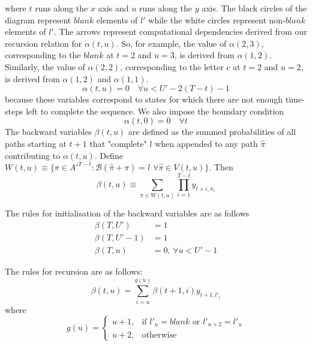 where $t$ runs along the $x$ axis and $u$ runs along the $y$ axis. The black circles of the diagram represent $blank$ elements of $l'$ while the white circles represent non-$blank$ elements of $l'$. The arrows represent computational dependencies derived from our recursion relation for $\alpha(t,u)$. So, for example, the value of $\alpha(2,3)$, corresponding to the $blank$ at $t=2$ and $u=3$, is derived from $\alpha(1,2)$. Similarly, the value of $\alpha(2,2)$, corresponding to the letter $c$ at $t=2$ and $u=2$, is derived from $\alpha(1,2)$ and $\alpha(1,1)$.
\begin{equation}
\alpha(t,u)=0 \quad \forall u < U'-2(T-t)-1
\label{eqn_c3_ctc07}\end{equation}
because these variables correspond to states for which there are not enough time-steps left to complete the sequence. We also impose the boundary condition
\begin{equation}
\alpha(t, 0) = 0 \quad \forall t
\label{eqn_c3_ctc08}
\end{equation}
The backward variables $\beta(t,u)$ are defined as the summed probabilities of all paths starting at $t + 1$ that "complete" $l$ when appended to any path $\hat{\pi}$ contributing to $\alpha(t,u)$. Define $W(t,u) \equiv \{ \pi \in A'^{T-t} : \mathcal{B}(\hat{\pi} + \pi) = l \, \, \forall \hat{\pi} \in V(t,u) \}$. Then
\begin{equation}
\beta(t,u) \equiv \sum_{\pi \in W(t,u)} \prod_{i=1}^{T - t} y_{t + i,\pi_i} \label{eqn_c3_ctc08}\end{equation}

The rules for initialisation of the backward variables are as follows
\begin{equation} \begin{aligned}
\beta(T, U') &= 1 \\
\beta(T, U' - 1) &= 1 \\
\beta(T, u) &= 0, \, \forall u < U' - 1
\end{aligned}\label{eqn_c3_ctc09}\end{equation}

The rules for recursion are as follows:
\begin{equation}
\beta(t, u) = \sum_{i = u}^{g(u)} \beta(t+1, i) y_{t+1, l'_i}\label{eqn_c3_ctc10}\end{equation}
where
\begin{equation}
g(u) = \begin{cases} u + 1,& \text{if } l'_u = blank \text{ or } l'_{u+2} = l'_{u} \\ u + 2,& \text{otherwise} \end{cases}   
\end{equation}

